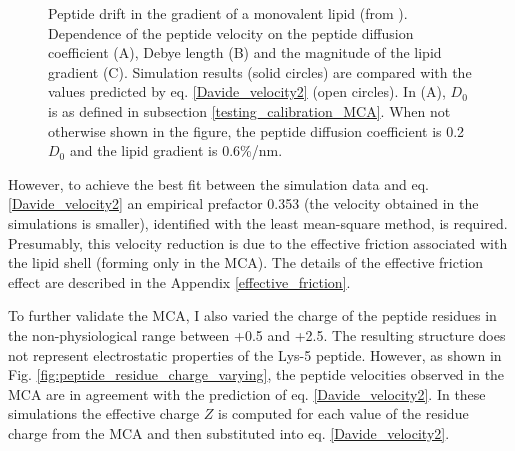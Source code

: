 \begin{figure}[!ht]
\begin{center}
\end{center}
 \caption[Peptide drift in the gradient of a monovalent lipid (1)]{Peptide drift in the gradient of a monovalent lipid (from \cite{Kiselev2011}). Dependence of the peptide velocity on the peptide diffusion coefficient (A), Debye length (B) and the magnitude of the lipid gradient (C). Simulation results (solid circles) are compared with the values predicted by eq. \eqref{Davide_velocity2} (open circles). In (A), $D_0$ is as defined in subsection \ref{testing_calibration_MCA}. When not otherwise shown in the figure, the peptide diffusion coefficient is 0.2$D_0$ and the lipid gradient is 0.6\%/nm.}
\label{fig:gradient_MCA_results}
\end{figure}

However, to achieve the best fit between the simulation data and eq. \eqref{Davide_velocity2} an empirical prefactor 0.353 (the velocity obtained in the simulations is smaller), identified with the least mean-square method, is required. Presumably, this \mbox{velocity} reduction is due to the effective friction associated with the lipid shell (forming only in the MCA). The details of the effective friction effect are described in the Appendix \ref{effective_friction}.

To further validate the MCA, I also varied the charge of the peptide residues in the non-physiological range between +0.5 and +2.5. The resulting structure does not represent electrostatic properties of the Lys-5 peptide. However, as shown in Fig. \ref{fig:peptide_residue_charge_varying}, the peptide velocities observed in the MCA are in agreement with the prediction of eq. \eqref{Davide_velocity2}. In these simulations the effective charge $Z$ is computed for each value of the residue charge from the MCA and then substituted into eq. \eqref{Davide_velocity2}.

